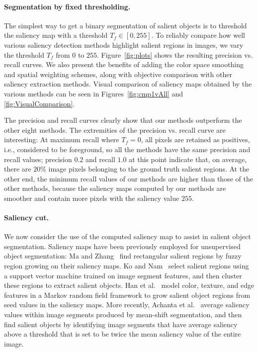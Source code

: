 \documentclass[10pt,twocolumn,letterpaper]{article}
\newcommand{\figref}[1]{Figure~\ref{#1}}
\newcommand{\vnudge}{\vspace*{-.1in}}
\newcommand{\mypara}[1]{\paragraph{#1.}}
\begin{document}
\vnudge
\mypara{Segmentation by fixed thresholding}
The simplest way to get a binary segmentation of salient objects is to
threshold the saliency map with a threshold $T_f \in [0, 255]$.
%
To reliably compare how well various saliency detection methods highlight salient regions in images,
we vary the threshold $T_f$ from $0$ to $255$. \figref{fig:plots} shows the resulting precision vs. recall curves.
%
We also present the  benefits of adding the color space smoothing and spatial weighting
schemes, along with objective comparison with other saliency extraction methods.
%
Visual comparison of saliency maps obtained by the various methods can be seen in
Figures~\ref{fig:cmp1vAll} and \ref{fig:VisualComparison}. %


The precision and recall curves clearly show that our methods outperform the other eight methods.
%
The extremities of the precision vs. recall curve are interesting: At maximum recall
where $T_f = 0$, all pixels are retained as positives, i.e., considered to be
foreground, so all the methods have the same precision and recall values; precision
$0.2$ and recall $1.0$ at this point indicate that, on average, there are $20\%$ image
pixels belonging to the ground truth salient regions.
%
At the other end, the minimum recall values of our methods are higher than those of the other
methods, because the saliency maps computed by our methods are smoother and contain more
pixels with the saliency value $255$.



\vnudge
\mypara{Saliency cut}
We now consider the use of the computed saliency map to assist in salient object segmentation.
%
Saliency maps have been previously employed for unsupervised object segmentation:
%
Ma and Zhang~\cite{03ACMMM/Ma_Contrast-based} find rectangular salient regions
by fuzzy region growing on their saliency maps.
%
Ko and Nam~\cite{06josa/KoN_InterestSegmentation} select salient regions using a support
vector machine trained on image segment features, and then cluster these
regions to extract salient objects.
%
Han et al.~\cite{06TCSVT/han_unsupervised} model color, texture, and edge features in a Markov
random field framework to grow salient object regions from seed values in the saliency maps.
%
More recently, Achanta et al.~\cite{09cvpr/Achanta_FTSaliency} average saliency values within
image segments produced by mean-shift segmentation, and then find salient objects by identifying
image segments that have average saliency above a threshold that is set to be twice the mean
saliency value of the entire image.
\end{document}
